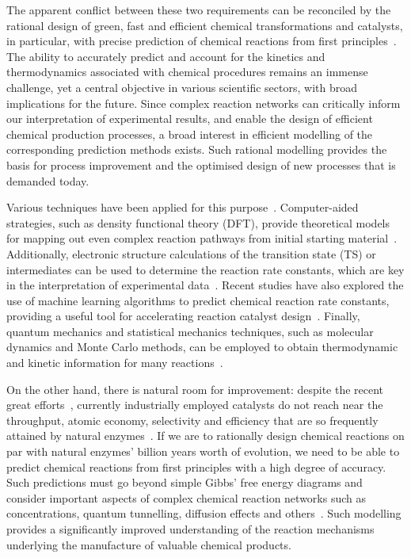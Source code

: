 The apparent conflict between these two requirements can be reconciled by
the rational design of green,
fast and efficient chemical transformations and catalysts,
in particular,
with precise prediction of chemical reactions from first principles~\cite{Kitchin_2012}.
The ability to accurately predict and account for the kinetics and thermodynamics associated
with chemical procedures remains an immense challenge,
yet a central objective in various scientific sectors,
with broad implications for the future.
Since complex reaction networks can critically inform our interpretation of experimental results,
and enable the design of efficient chemical production processes,
a broad interest in efficient modelling of the corresponding prediction methods exists.
Such rational modelling provides the basis for process improvement and the optimised design of new processes
that is demanded today.

Various techniques have been applied for this purpose~\cite{Houk_2014,Chew_2020,Chin_2022,Cao2022}.
Computer-aided strategies,
such as density functional theory (DFT),
provide theoretical models for mapping out even complex reaction pathways from initial starting material~\cite{Maeda_2011,Simm_2017,Rappoport_2019}.
Additionally,
electronic structure calculations of the transition state (TS) or intermediates can be used to determine the reaction rate constants,
which are key in the interpretation of experimental data~\cite{Plata_2015,Santoro_2016,Coelho_2019,Oliveira_2020}.
Recent studies have also explored the use of machine learning algorithms
to predict chemical reaction rate constants,
providing a useful tool for
accelerating reaction catalyst design~\cite{Komp_2022,Tu_2022}.
Finally,
quantum mechanics and statistical mechanics techniques,
such as molecular dynamics and Monte Carlo methods,
can be employed to obtain thermodynamic and kinetic information for many reactions~\cite{Wang_2014}.

On the other hand,
there is natural room for improvement:
despite the recent great efforts~\cite{Peng_2016},
currently industrially employed catalysts do
not reach near the throughput,
atomic economy,
selectivity and efficiency that
are so frequently attained by natural
enzymes~\cite{Catalysis_in_Chemistry_and_Enzymology}.
If we are to rationally design chemical reactions on par with natural enzymes' billion years worth of evolution,
we need to be able to predict chemical reactions from first principles with a
high degree of accuracy.
Such predictions must go beyond simple Gibbs' free energy
diagrams and consider important aspects of complex chemical reaction networks
such as concentrations,
quantum tunnelling,
diffusion effects and others~\cite{Besora_2018}.
Such modelling provides a significantly improved understanding of the reaction mechanisms underlying the manufacture of valuable chemical products.

